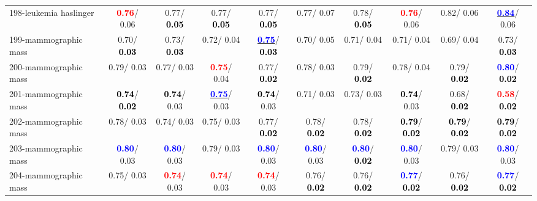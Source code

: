 \begin{table}[h]
\begin{center}
{\begin{tabular}{lc|c|c|c|c|c|c|c|c}
198-leukemia haslinger & \textcolor{red}{\textbf{  0.76}}/  0.06 &   0.77/\textcolor{black}{\textbf{  0.05}} &   0.77/\textcolor{black}{\textbf{  0.05}} &   0.77/\textcolor{black}{\textbf{  0.05}} &   0.77/  0.07 &   0.78/\textcolor{black}{\textbf{  0.05}} & \textcolor{red}{\textbf{  0.76}}/  0.06 &   0.82/  0.06 & \underline{\textcolor{blue}{\textbf{  0.84}}}/  0.06 \\
199-mammographic mass &   0.70/\textcolor{black}{\textbf{  0.03}} &   0.73/\textcolor{black}{\textbf{  0.03}} &   0.72/  0.04 & \underline{\textcolor{blue}{\textbf{  0.75}}}/\textcolor{black}{\textbf{  0.03}} &   0.70/  0.05 &   0.71/  0.04 &   0.71/  0.04 &   0.69/  0.04 &   0.73/\textcolor{black}{\textbf{  0.03}} \\ \hline
200-mammographic mass &   0.79/  0.03 &   0.77/  0.03 & \textcolor{red}{\textbf{  0.75}}/  0.04 &   0.77/\textcolor{black}{\textbf{  0.02}} &   0.78/  0.03 &   0.79/\textcolor{black}{\textbf{  0.02}} &   0.78/  0.04 &   0.79/\textcolor{black}{\textbf{  0.02}} & \textcolor{blue}{\textbf{  0.80}}/\textcolor{black}{\textbf{  0.02}} \\
201-mammographic mass & \textcolor{black}{\textbf{  0.74}}/\textcolor{black}{\textbf{  0.02}} & \textcolor{black}{\textbf{  0.74}}/  0.03 & \underline{\textcolor{blue}{\textbf{  0.75}}}/  0.03 & \textcolor{black}{\textbf{  0.74}}/  0.03 &   0.71/  0.03 &   0.73/  0.03 & \textcolor{black}{\textbf{  0.74}}/  0.03 &   0.68/\textcolor{black}{\textbf{  0.02}} & \textcolor{red}{\textbf{  0.58}}/\textcolor{black}{\textbf{  0.02}} \\
202-mammographic mass &   0.78/  0.03 &   0.74/  0.03 &   0.75/  0.03 &   0.77/\textcolor{black}{\textbf{  0.02}} &   0.78/\textcolor{black}{\textbf{  0.02}} &   0.78/\textcolor{black}{\textbf{  0.02}} & \textcolor{black}{\textbf{  0.79}}/\textcolor{black}{\textbf{  0.02}} & \textcolor{black}{\textbf{  0.79}}/\textcolor{black}{\textbf{  0.02}} & \textcolor{black}{\textbf{  0.79}}/\textcolor{black}{\textbf{  0.02}} \\
203-mammographic mass & \textcolor{blue}{\textbf{  0.80}}/  0.03 & \textcolor{blue}{\textbf{  0.80}}/  0.03 &   0.79/  0.03 & \textcolor{blue}{\textbf{  0.80}}/  0.03 & \textcolor{blue}{\textbf{  0.80}}/  0.03 & \textcolor{blue}{\textbf{  0.80}}/\textcolor{black}{\textbf{  0.02}} & \textcolor{blue}{\textbf{  0.80}}/  0.03 &   0.79/  0.03 & \textcolor{blue}{\textbf{  0.80}}/  0.03 \\
204-mammographic mass &   0.75/  0.03 & \textcolor{red}{\textbf{  0.74}}/  0.03 & \textcolor{red}{\textbf{  0.74}}/  0.03 & \textcolor{red}{\textbf{  0.74}}/  0.03 &   0.76/\textcolor{black}{\textbf{  0.02}} &   0.76/\textcolor{black}{\textbf{  0.02}} & \textcolor{blue}{\textbf{  0.77}}/\textcolor{black}{\textbf{  0.02}} &   0.76/\textcolor{black}{\textbf{  0.02}} & \textcolor{blue}{\textbf{  0.77}}/\textcolor{black}{\textbf{  0.02}} \\

\end{tabular}}
\end{center}
\end{table}

